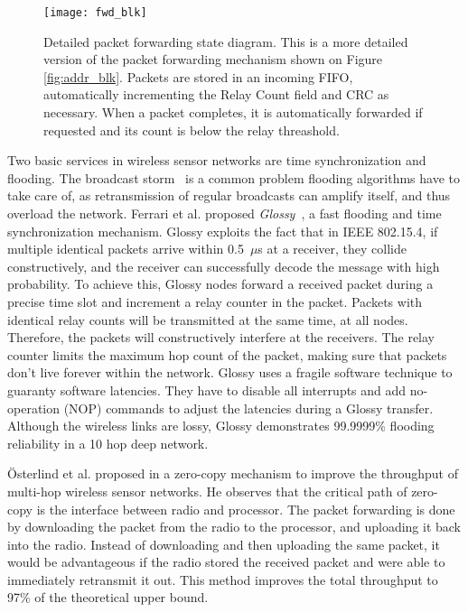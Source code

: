 \begin{figure}[ht]
\centering
\texttt{[image: fwd\_blk]}
\caption{Detailed packet forwarding state diagram. This is a more detailed
version of the packet forwarding mechanism shown on Figure \ref{fig:addr_blk}.
Packets are stored in an incoming FIFO, automatically incrementing the Relay
Count field and CRC as necessary. When a packet completes, it is automatically
forwarded if requested and its count is below the relay threashold.}
\label{fig:fwd_blk}
\end{figure}

Two basic services in wireless sensor networks are time synchronization and
flooding. The broadcast storm~\cite{syn:broadcast} is a common problem
flooding algorithms have to take care of, as retransmission of regular
broadcasts can amplify itself, and thus overload the network. Ferrari et al.
proposed {\em Glossy}~\cite{ferrari:efficient}, a fast flooding and time
synchronization mechanism. Glossy exploits the fact that in IEEE 802.15.4, if
multiple identical packets arrive within 0.5~$\mu$s at a receiver, they
collide constructively, and the receiver can successfully decode the message
with high probability. To achieve this, Glossy nodes forward a received packet
during a precise time slot and increment a relay counter in the packet.
Packets with identical relay counts will be transmitted at the same time, at
all nodes. Therefore, the packets will constructively interfere at the
receivers. The relay counter limits the maximum hop count of the packet,
making sure that packets don't live forever within the network. Glossy uses a
fragile software technique to guaranty software latencies. They have to
disable all interrupts and add no-operation (NOP) commands to adjust the
latencies during a Glossy transfer. Although the wireless links are lossy,
Glossy demonstrates 99.9999\% flooding reliability in a 10 hop deep network.

\"{O}sterlind et al. proposed in \cite{zero_copy} a zero-copy mechanism to
improve the throughput of multi-hop wireless sensor networks. He observes that
the critical path of zero-copy is the interface between radio and processor.
The packet forwarding is done by downloading the packet from the radio to the
processor, and uploading it back into the radio. Instead of
downloading and then uploading the same packet, it would be advantageous if
the radio stored the received packet and were able to immediately retransmit
it out. This method improves the total throughput to 97\% of the theoretical
upper bound.


